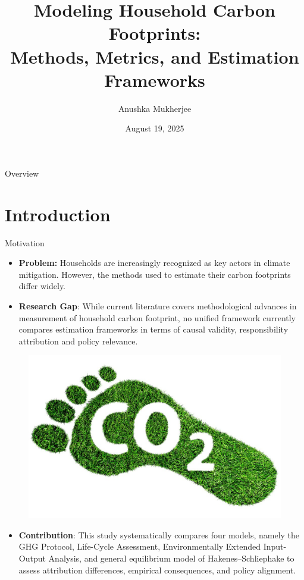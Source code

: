 \documentclass{beamer}
\title[Modeling Household Carbon Footprints]{Modeling Household Carbon Footprints:\\ Methods, Metrics, and Estimation Frameworks}
\author[Anushka Mukherjee]{Anushka Mukherjee}
\institute[University of Bonn]{University of Bonn}
\date[July 2025]{August 19, 2025}
\begin{document}
\begin{frame}
  \titlepage
\end{frame}

\begin{frame}{Overview}
  \tableofcontents
\end{frame}

\section{Introduction}
\begin{frame}{Motivation}
\vspace{-2.0em}
\footnotesize
\begin{itemize}
    \item {\textbf{Problem: }}Households are increasingly recognized as key actors in climate mitigation. However, the methods used to estimate their carbon footprints differ widely.
    \pause
    \item \textbf{Research Gap}: While current literature covers methodological advances in measurement of household carbon footprint, no unified framework currently compares estimation frameworks in terms of causal validity, responsibility attribution and policy relevance.
\end{itemize}

\begin{figure}
\centering
    \includegraphics[width=0.3\linewidth]{co2.jpg}
\end{figure}

\pause
\begin{itemize}
\item \textbf{Contribution}: This study systematically compares four models, namely the GHG Protocol, Life-Cycle Assessment, Environmentally Extended Input-Output Analysis, and general equilibrium model of Hakenes–Schliephake to assess attribution differences, empirical consequences, and policy alignment.
\end{itemize}
\end{frame}
\end{document}
